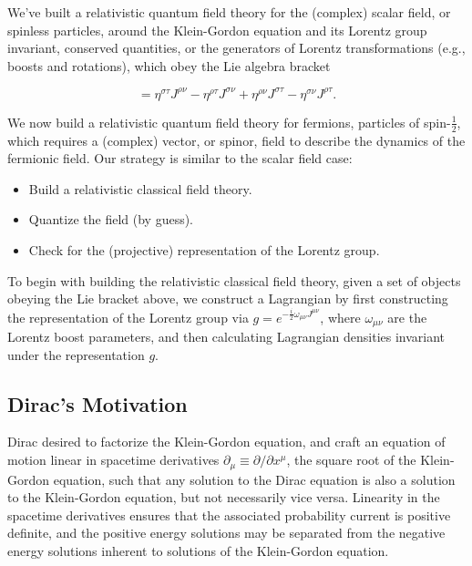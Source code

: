 
\noindent We've built a relativistic quantum field theory for the (complex) scalar field, or spinless particles, around the Klein-Gordon equation and its Lorentz group invariant, conserved quantities, or the generators of Lorentz transformations (e.g., boosts and rotations), which obey the Lie algebra bracket

\begin{equation}
[J^{\rho \sigma}, J^{\tau \nu}] = \eta^{\sigma \tau} J^{\rho\nu} - \eta^{\rho \tau} J^{\sigma \nu} + \eta^{\rho\nu} J^{\sigma \tau} - \eta^{\sigma \nu} J^{\rho \tau} .
\end{equation} 

\noindent We now build a relativistic quantum field theory for fermions, particles of spin-$\frac{1}{2}$, which requires a (complex) vector, or spinor, field to describe the dynamics of the fermionic field. Our strategy is similar to the scalar field case:

\begin{itemize}
\item Build a relativistic classical field theory.
\item Quantize the field (by guess).
\item Check for the (projective) representation of the Lorentz group.
\end{itemize}

\noindent To begin with building the relativistic classical field theory, given a set of objects obeying the Lie bracket above, we construct a Lagrangian by first constructing the representation of the Lorentz group via $g=e^{-\frac{i}{2} \omega_{\mu\nu}J^{\mu\nu}}$, where $\omega_{\mu\nu}$ are the Lorentz boost parameters, and then calculating Lagrangian densities invariant under the representation $g$.

\subsection*{Dirac's Motivation}

\noindent Dirac desired to factorize the Klein-Gordon equation, and craft an equation of motion linear in spacetime derivatives $\partial_\mu \equiv \partial / \partial x^\mu$, the square root of the Klein-Gordon equation, such that any solution to the Dirac equation is also a solution to the Klein-Gordon equation, but not necessarily vice versa. Linearity in the spacetime derivatives ensures that the associated probability current is positive definite, and the positive energy solutions may be separated from the negative energy solutions inherent to solutions of the Klein-Gordon equation. \\

